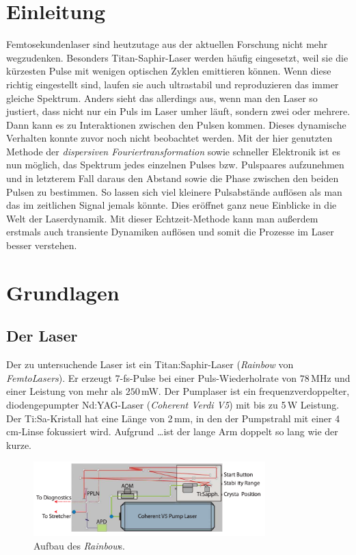 \documentclass[bachelor,       %
               twoside,        %
               BCOR10mm,       %
               english,ngerman, %
               ]{GAUBM}
\begin{document}
\mainmatter   %

\chapter{Einleitung}
Femtosekundenlaser sind heutzutage aus der aktuellen Forschung nicht mehr wegzudenken.
Besonders Titan-Saphir-Laser werden häufig eingesetzt, weil sie die kürzesten Pulse mit wenigen optischen Zyklen emittieren können.
Wenn diese richtig eingestellt sind, laufen sie auch ultrastabil und reproduzieren das immer gleiche Spektrum.
Anders sieht das allerdings aus, wenn man den Laser so justiert, dass nicht nur ein Puls im Laser umher läuft, sondern zwei oder mehrere.
Dann kann es zu Interaktionen zwischen den Pulsen kommen.
Dieses dynamische Verhalten konnte zuvor noch nicht beobachtet werden.
Mit der hier genutzten Methode der \textit{dispersiven Fouriertransformation} sowie schneller Elektronik ist es nun möglich, das Spektrum jedes einzelnen Pulses bzw. Pulspaares aufzunehmen und in letzterem Fall daraus den Abstand sowie die Phase zwischen den beiden Pulsen zu bestimmen.
So lassen sich viel kleinere Pulsabstände auflösen als man das im zeitlichen Signal jemals könnte.
Dies eröffnet ganz neue Einblicke in die Welt der Laserdynamik.
Mit dieser Echtzeit-Methode kann man außerdem erstmals auch transiente Dynamiken auflösen und somit die Prozesse im Laser besser verstehen.


\chapter{Grundlagen}

\section{Der Laser}
Der zu untersuchende Laser ist ein Titan:Saphir-Laser (\textit{Rainbow} von \textit{FemtoLasers}).
Er erzeugt 7-fs-Pulse bei einer Puls-Wiederholrate von $78\,$MHz und einer Leistung von mehr als $250\,$mW.
Der Pumplaser ist ein frequenzverdoppelter, diodengepumpter Nd:YAG-Laser (\textit{Coherent Verdi V5}) mit bis zu 5\,W Leistung.
Der Ti:Sa-Kristall hat eine Länge von 2\,mm, in den der Pumpstrahl mit einer 4\,cm-Linse fokussiert wird.
Aufgrund \dots ist der lange Arm doppelt so lang wie der kurze.
\begin{figure}[!htb]
	\centering
	\includegraphics[width=0.8\textwidth]{figures/rainbow.png}
	\caption{Aufbau des \textit{Rainbow}s.}
	\label{fig:rainbow}
\end{figure}
\end{document}
